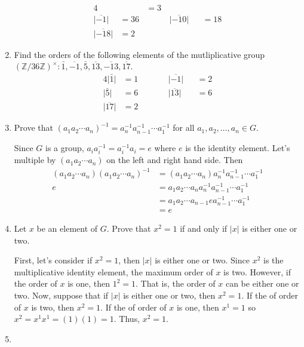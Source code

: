 \begin{enumerate}
\begin{alignat*}{4}
    &&{}= 3\\
    \lvert\overline{-1}\rvert & = 36 & \qquad & \lvert\overline{-10}\rvert
    &&{}= 18\\
    \lvert\overline{-18}\rvert & = 2
  \end{alignat*}
\item
  Find the orders of the following elements of the mutliplicative group
  \((\mathbb{Z}/36\mathbb{Z})^{\times}\colon\bar{1}, \overline{-1}, \bar{5},
  \overline{13}, \overline{-13}, \overline{17}\).
  \begin{alignat*}{4}
    \lvert\bar{1}\rvert & = 1 & \qquad & \lvert\overline{-1}\rvert &&{}= 2\\
    \lvert\bar{5}\rvert & = 6 & \qquad & \lvert\overline{13}\rvert &&{}= 6\\
    \lvert\overline{17}\rvert & = 2
  \end{alignat*}
\item
  Prove that
  \((a_1a_2\cdots a_n)^{-1} = a_n^{-1}a_{n - 1}^{-1}\cdots a_1^{-1}\) for all
  \(a_1,a_2,\ldots,a_n\in G\).
  \par\smallskip
  Since \(G\) is a group, \(a_ia_i^{-1} = a_i^{-1}a_i = e\) where \(e\) is the
  identity element.
  Let's multiple by \((a_1a_2\cdots a_n)\) on the left and right hand side.
  Then
  \begin{align*}
    (a_1a_2\cdots a_n)(a_1a_2\cdots a_n)^{-1}
    & = (a_1a_2\cdots a_n)a_n^{-1}a_{n - 1}^{-1}\cdots a_1^{-1}\\
    e & = a_1a_2\cdots a_na_n^{-1}a_{n - 1}^{-1}\cdots a_1^{-1}\\
    & = a_1a_2\cdots a_{n - 1}ea_{n - 1}^{-1}\cdots a_1^{-1}\\
    &= e
  \end{align*}
\item
  Let \(x\) be an element of \(G\).
  Prove that \(x^2 = 1\) if and only if \(\lvert x\rvert\) is either one or
  two.
  \par\smallskip
  First, let's consider if \(x^2 = 1\), then \(\lvert x\rvert\) is either one
  or two.
  Since \(x^2\) is the multiplicative identity element, the maximum order of
  \(x\) is two.
  However, if the order of \(x\) is one, then \(1^2 = 1\).
  That is, the order of \(x\) can be either one or two.
  Now, suppose that if \(\lvert x\rvert\) is either one or two, then
  \(x^2 = 1\).
  If the of order of \(x\) is two, then \(x^2 = 1\).
  If the of order of \(x\) is one, then \(x^1 = 1\) so
  \(x^2 = x^1x^1 = (1)(1) = 1\).
  Thus, \(x^2 = 1\).
\item

\end{enumerate}
